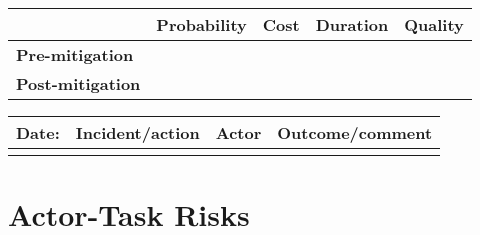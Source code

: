 \begin{table}
\begin{tabularx}{\textwidth}{| l | l | X | X | X |}
		\hline
		 &  \textbf{Probability} & \textbf{Cost} & \textbf{Duration} & \textbf{Quality} \\ \hline
		\textbf{Pre-mitigation} &  &  &  &  \\ \hline
		\textbf{Post-mitigation} &  &  &  &  \\ \hline \hline
	\end{tabularx}
	\begin{tabularx}{\textwidth}{| l | X | l | X |}
		\hline
		\textbf{Date:} & \textbf{Incident/action} & \textbf{Actor} & \textbf{Outcome/comment} \\ \hline
		 &  &  &  \\ \hline
	\end{tabularx}%
\end{table}

\FloatBarrier

\section{Actor-Task Risks}
\label{Actor-Task_Risks}

\FloatBarrier

